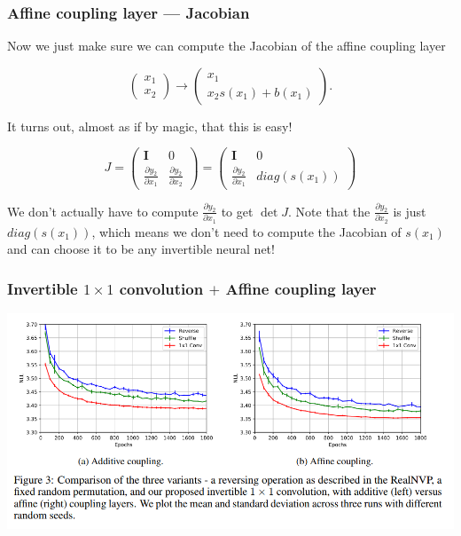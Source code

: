 \documentclass{beamer}
\begin{document}
\begin{frame}
  \frametitle{Affine coupling layer --- Jacobian}

  Now we just make sure we can compute the Jacobian of the affine coupling layer

  \[
    \begin{pmatrix} x_1 \\ x_2 \end{pmatrix} \rightarrow
    \begin{pmatrix} x_1 \\ x_2 s(x_1) + b(x_1) \end{pmatrix}.
  \]

  It turns out, almost as if by magic, that this is easy!

  \[
    J = \begin{pmatrix}
      \symbf{I} & 0 \\
      \frac{\partial y_2}{\partial x_1} & \frac{\partial y_2}{\partial x_2}
    \end{pmatrix} = \begin{pmatrix}
      \symbf{I} & 0 \\
      \frac{\partial y_2}{\partial x_1} & diag(s(x_1))
    \end{pmatrix}
  \]

  We don't actually have to compute $\frac{\partial y_2}{\partial x_1}$ to get
  $\det J$.  Note that the $\frac{\partial y_2}{\partial x_2}$ is just
  $diag(s(x_1))$, which means we don't need to compute the Jacobian of $s(x_1)$
  and can choose it to be any invertible neural net!


  \href{https://github.com/kmkolasinski/deep-learning-notes/blob/master/seminars/2018-10-Normalizing-Flows-NICE-RealNVP-GLOW/notebooks/flow_layers.py}{}
\end{frame}

\begin{frame}
  \frametitle{Invertible $1\times1$ convolution $+$ Affine coupling layer}

  \includegraphics[width=1.0\textwidth]{conv-vs-shuffle-reverse.png}
\end{frame}
\end{document}
